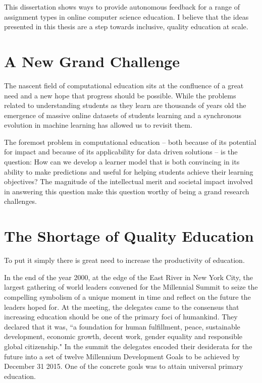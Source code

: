 This dissertation shows ways to provide autonomous feedback for a range of assignment types in online computer science education. I believe that the ideas presented in this thesis are a step towards inclusive, quality education at scale.

\section{A New Grand Challenge}

The nascent field of computational education sits at the confluence of a great need and a new hope that progress should be possible. While the problems related to understanding students as they learn are thousands of years old the emergence of massive online datasets of students learning and a synchronous evolution in machine learning has allowed us to revisit them. 

The foremost problem in computational education -- both because of its potential for impact and because of its applicability for data driven solutions -- is the question: How can we develop a learner model that is both convincing in its ability to make predictions and useful for helping students achieve their learning objectives? The magnitude of the intellectual merit and societal impact involved in answering this question make this question worthy of being a grand research challenges.

\section{The Shortage of Quality Education}

To put it simply there is great need to increase the productivity of education.

In the end of the year 2000, at the edge of the East River in New York City, the largest gathering of world leaders convened for the Millennial Summit to seize the compelling symbolism of a unique moment in time and reflect on the future the leaders hoped for. At the meeting, the delegates came to the consensus that increasing education should be one of the primary foci of humankind. They declared that it was, ``a foundation for human fulfillment, peace, sustainable development, economic
growth, decent work, gender equality and responsible global citizenship." In the summit the delegates encoded their desiderata for the future into a set of twelve Millennium Development Goals to be achieved by December 31 2015. One of the concrete goals was to attain universal primary education. 

